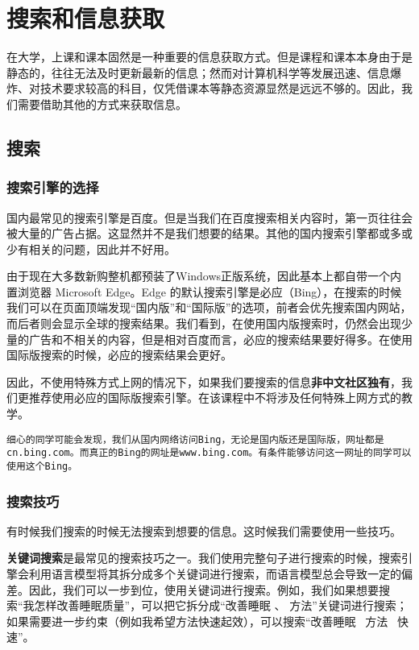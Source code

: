 \documentclass[../main.tex]{subfiles}
\begin{document}
\chapter{搜索和信息获取} %

在大学，上课和课本固然是一种重要的信息获取方式。但是课程和课本本身由于是静态的，往往无法及时更新最新的信息；然而对计算机科学等发展迅速、信息爆炸、对技术要求较高的科目，仅凭借课本等静态资源显然是远远不够的。因此，我们需要借助其他的方式来获取信息。

\section{搜索}

\subsection{搜索引擎的选择}

国内最常见的搜索引擎是百度。但是当我们在百度搜索相关内容时，第一页往往会被大量的广告占据。这显然并不是我们想要的结果。其他的国内搜索引擎都或多或少有相关的问题，因此并不好用。

由于现在大多数新购整机都预装了Windows正版系统，因此基本上都自带一个内置浏览器 Microsoft Edge。Edge 的默认搜索引擎是必应（Bing），在搜索的时候我们可以在页面顶端发现“国内版”和“国际版”的选项，前者会优先搜索国内网站，而后者则会显示全球的搜索结果。我们看到，在使用国内版搜索时，仍然会出现少量的广告和不相关的内容，但是相对百度而言，必应的搜索结果要好得多。在使用国际版搜索的时候，必应的搜索结果会更好。

因此，不使用特殊方式上网的情况下，如果我们要搜索的信息\textbf{非中文社区独有}，我们更推荐使用必应的国际版搜索引擎。在该课程中不将涉及任何特殊上网方式的教学。

\texttt{细心的同学可能会发现，我们从国内网络访问Bing，无论是国内版还是国际版，网址都是cn.bing.com。而真正的Bing的网址是www.bing.com。有条件能够访问这一网址的同学可以使用这个Bing。}

\subsection{搜索技巧}

有时候我们搜索的时候无法搜索到想要的信息。这时候我们需要使用一些技巧。

\textbf{关键词搜索}是最常见的搜索技巧之一。我们使用完整句子进行搜索的时候，搜索引擎会利用语言模型将其拆分成多个关键词进行搜索，而语言模型总会导致一定的偏差。因此，我们可以一步到位，使用关键词进行搜索。例如，我们如果想要搜索“我怎样改善睡眠质量”，可以把它拆分成“改善睡眠 、 方法”关键词进行搜索；如果需要进一步约束（例如我希望方法快速起效），可以搜索“改善睡眠 \ 方法 \ 快速”。
\end{document}
